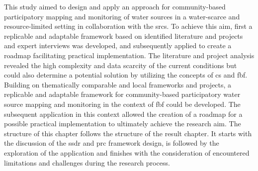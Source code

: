 



This study aimed to design and apply an approach for community-based participatory mapping and monitoring of water sources in a water-scarce and resource-limited setting in collaboration with the \acrlong{srcs}. To achieve this aim, first a replicable and adaptable framework based on identified literature and projects and expert interviews was developed, and subsequently applied to create a roadmap facilitating practical implementation.\newline
The literature and project analysis revealed the high complexity and data scarcity of the current conditions but could also determine a potential solution by utilizing the concepts of \acrlong{cs} and \acrlong{fbf}. Building on thematically comparable and local frameworks and projects, a replicable and adaptable framework for community-based participatory water source mapping and monitoring in the context of \acrlong{fbf} could be developed. The subsequent application in this context allowed the creation of a roadmap for a possible practical implementation to ultimately achieve the research aim.\newline
The structure of this chapter follows the structure of the result chapter. It starts with the discussion of the \acrshort{ssdr} and \acrshort{prc} framework design, is followed by the exploration of the application and finishes with the consideration of encountered limitations and challenges during the research process.

